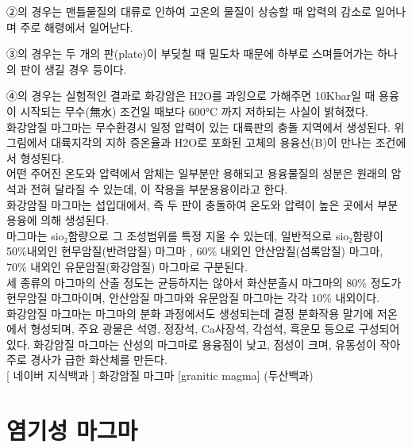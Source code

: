 \documentclass[12pt, a4paper, twoside]{book}
\begin{document}
				②의 경우는 맨틀물질의 대류로 인하여 고온의 물질이 상승할 때 압력의 감소로 일어나며 주로 해령에서 일어난다. 
				
				③의 경우는 두 개의 판(plate)이 부딪칠 때 밀도차 때문에 하부로 스며들어가는 하나의 판이 생길 경우 등이다. 
				
				④의 경우는 실험적인 결과로 화강암은 H2O를 과잉으로 가해주면 10Kbar일 때 용융이 시작되는 무수(無水) 조건일 때보다 600°C 까지 저하되는 사실이 밝혀졌다. \\
				
				화강암질 마그마는 무수환경시 일정 압력이 있는 대륙판의 충돌 지역에서 생성된다. 위 그림에서 대륙지각의 지하 증온율과 H2O로 포화된 고체의 용융선(B)이 만나는 조건에서 형성된다. \\
				
				어떤 주어진 온도와 압력에서 암체는 일부분만 용해되고 용융물질의 성분은 원래의 암석과 전혀 달라질 수 있는데, 이 작용을 부분용융이라고 한다.  \\
				
				화강암질 마그마는 섭입대에서, 즉 두 판이 충돌하여 온도와 압력이 높은 곳에서 부분용융에 의해 생성된다. \\
				
				마그마는 sio₂함량으로 그 조성범위를 특정 지울 수 있는데, 일반적으로 sio₂함량이 50\%내외인 현무암질(반려암질) 마그마 , 60\% 내외인 안산암질(섬록암질) 마그마, 70\% 내외인 유문암질(화강암질) 마그마로 구분된다.  \\
				
				세 종류의 마그마의 산출 정도는 균등하지는 않아서 화산분출시 마그마의 80\% 정도가 현무암질 마그마이며, 안산암질 마그마와 유문암질 마그마는 각각 10\% 내외이다.  \\
				
				화강암질 마그마는 마그마의 분화 과정에서도 생성되는데 결정 분화작용 말기에 저온에서 형성되며, 주요 광물은 석영, 정장석, Ca사장석, 각섬석, 흑운모 등으로 구성되어 있다. 
				화강암질 마그마는 산성의 마그마로 용융점이 낮고, 점성이 크며, 유동성이 작아 주로 경사가 급한 화산체를 만든다.   \\
				
				[ 네이버 지식백과 ] 화강암질 마그마 [granitic magma] (두산백과)



	\clearpage
	\section{염기성 마그마}
	
\end{document}
